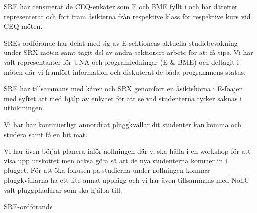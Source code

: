 \documentclass[../_main/handlingar.tex]{subfiles}
\begin{document}

SRE har censurerat de CEQ-enkäter som E och BME fyllt i och har därefter representerat och fört fram åsikterna från respektive klass för respektive kurs vid CEQ-möten.

SREs ordförande har delat med sig av E-sektionens aktuella studiebevakning under SRX-möten samt tagit del av andra sektioners arbete för att få tips. Vi har valt representanter för UNA och programledningar (E \& BME) och deltagit i möten där vi framfört information och diskuterat de båda programmens status.

SRE har tillsammans med kåren och SRX genomfört en åsiktshörna i E-foajen med syftet att med hjälp av enkäter för att se vad studenterna tycker saknas i utbildningen.

Vi har har kontinuerligt annordnat pluggkvällar dit studenter kan komma och studera samt få en bit mat.

Vi har även börjat planera inför nollningen där vi ska hålla i en workshop för att visa upp utskottet men också göra så att de nya studenterna kommer in i plugget. För att öka fokusen på studierna under nollningen kommer pluggkvällarna ha ett lite annat upplägg och vi har även tillsammans med NollU valt pluggphaddrar som ska hjälpa till.

\begin{signatures}{1}
    \mvh
    \signature{Johan Persson}{SRE-ordförande}
\end{signatures}
\end{document}
